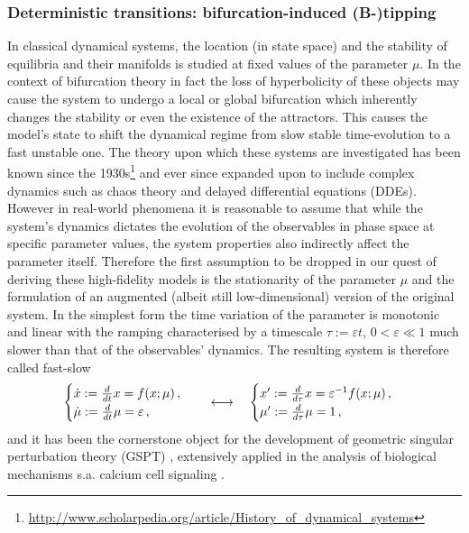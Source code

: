 \documentclass[../main.tex]{subfiles}
\begin{document}
\subsubsection{Deterministic transitions: bifurcation-induced (B-)tipping}\label{subsubsec3.1.1}
In classical dynamical systems, the location (in state space) and the stability of equilibria and their manifolds is studied at fixed values of the parameter $\mu$.
In the context of bifurcation theory in fact the loss of hyperbolicity of these objects may cause the system to undergo a local or global bifurcation which inherently changes the stability or even the existence of the attractors. 
This causes the model's state to shift the dynamical regime from slow stable time-evolution to a fast unstable one.
The theory upon which these systems are investigated has been known since the 1930s\footnote{\url{http://www.scholarpedia.org/article/History\_of\_dynamical\_systems}} and ever since expanded upon to include complex dynamics such as chaos theory and delayed differential equations (DDEs).
However in real-world phenomena it is reasonable to assume that while the system's dynamics dictates the evolution of the observables in phase space at specific parameter values, the system properties also indirectly affect the parameter itself.
Therefore the first assumption to be dropped in our quest of deriving these high-fidelity models is the stationarity of the parameter $\mu$ and the formulation of an augmented (albeit still low-dimensional) version of the original system. 
In the simplest form the time variation of the parameter is monotonic and linear with the ramping characterised by a timescale $\tau:=\varepsilon t$, $0<\varepsilon\ll1$ much slower than that of the observables' dynamics.
The resulting system is therefore called fast-slow
\begin{equation}\label{eq3.1}
   \begin{cases}
           \dot{x}:=\frac{d}{dt}x=f(x;\mu) \,, \\
           \dot{\mu}:=\frac{d}{dt}\mu=\varepsilon \,, 
   \end{cases}\quad \longleftrightarrow\quad
   \begin{cases}
           x':=\frac{d}{d\tau}x=\varepsilon^{-1}f(x;\mu)\,, \\
           \mu':=\frac{d}{d\tau}\mu=1\,,
   \end{cases}
\end{equation}
and it has been the cornerstone object for the development of geometric singular perturbation theory (GSPT) \cite{Wechselberger20}, extensively applied in the analysis of biological mechanisms s.a. calcium cell signaling \cite{Pages19}.
\end{document}
